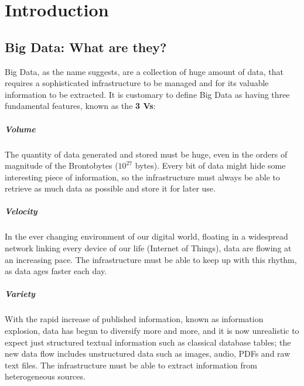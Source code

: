\chapter{Introduction}

\section{Big Data: What are they?}

Big Data, as the name suggests, are a collection of huge amount of data, that requires a sophisticated infrastructure to be managed and for its valuable information to be extracted.\newline
It is customary to define Big Data as having three fundamental features, known as the \textbf{3 Vs}:

\paragraph{Volume}

The quantity of data generated and stored must be huge, even in the orders of magnitude of the Brontobytes ($10^{27}$ bytes).
Every bit of data might hide some interesting piece of information, so the infrastructure must always be able to retrieve as much data as possible and store it for later use.

\paragraph{Velocity}

In the ever changing environment of our digital world, floating in a widespread network linking every device of our life (Internet of Things), data are flowing at an increasing pace. The infrastructure must be able to keep up with this rhythm, as data ages faster each day.

\paragraph{Variety}

With the rapid increase of published information, known as information explosion, data has begun to diversify more and more, and it is now unrealistic to expect just structured textual information such as classical database tables; the new data flow includes unstructured data such as images, audio, PDFs and raw text files. The infrastructure must be able to extract information from heterogeneous sources.



